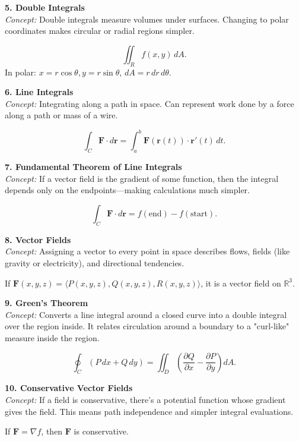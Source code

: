 \documentclass[9pt]{article}
\begin{document}
\begin{multicols}{2}
\begin{tcolorbox}[title=, colframe=brightpink]
\textbf{5. Double Integrals}\\
\textit{Concept:} Double integrals measure volumes under surfaces. Changing to polar coordinates makes circular or radial regions simpler.

\[
\iint_{R} f(x,y)\,dA.
\]
In polar: $x=r\cos\theta, y=r\sin\theta$, $dA=r\,dr\,d\theta$.
\end{tcolorbox}

\begin{tcolorbox}[title=, colframe=brightyellow]
\textbf{6. Line Integrals}\\
\textit{Concept:} Integrating along a path in space. Can represent work done by a force along a path or mass of a wire.

\[
\int_C \mathbf{F}\cdot d\mathbf{r}=\int_a^b \mathbf{F}(\mathbf{r}(t))\cdot \mathbf{r}'(t)\,dt.
\]
\end{tcolorbox}

\begin{tcolorbox}[title=, colframe=brightblue]
\textbf{7. Fundamental Theorem of Line Integrals}\\
\textit{Concept:} If a vector field is the gradient of some function, then the integral depends only on the endpoints—making calculations much simpler.

\[
\int_C \mathbf{F}\cdot d\mathbf{r}=f(\text{end})-f(\text{start}).
\]
\end{tcolorbox}

\begin{tcolorbox}[title=, colframe=brightgreen]
\textbf{8. Vector Fields}\\
\textit{Concept:} Assigning a vector to every point in space describes flows, fields (like gravity or electricity), and directional tendencies.

If $\mathbf{F}(x,y,z)=\langle P(x,y,z),Q(x,y,z),R(x,y,z)\rangle$, it is a vector field on $\mathbb{R}^3$.
\end{tcolorbox}

\begin{tcolorbox}[title=, colframe=brightpink]
\textbf{9. Green's Theorem}\\
\textit{Concept:} Converts a line integral around a closed curve into a double integral over the region inside. It relates circulation around a boundary to a "curl-like" measure inside the region.

\[
\oint_{C} (P\,dx + Q\,dy) = \iint_{D}\left(\frac{\partial Q}{\partial x} - \frac{\partial P}{\partial y}\right)dA.
\]
\end{tcolorbox}

\begin{tcolorbox}[title=, colframe=brightyellow]
\textbf{10. Conservative Vector Fields}\\
\textit{Concept:} If a field is conservative, there's a potential function whose gradient gives the field. This means path independence and simpler integral evaluations.

If $\mathbf{F}=\nabla f$, then $\mathbf{F}$ is conservative.
\end{tcolorbox}

\end{multicols}
\end{document}
